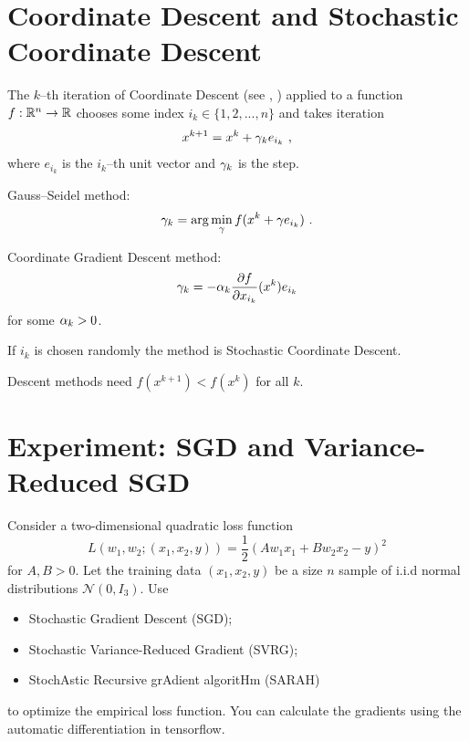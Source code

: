 \section{Coordinate Descent and Stochastic Coordinate Descent}

The $k$--th iteration of Coordinate Descent (see \cite{CoordinateDescentWrightPaper}, \cite{CoordinateDescentNesterovPaper}) applied to a function $f: \mathbb R^n\rightarrow \mathbb R$ chooses some index $i_k\in \{1,2,...,n\}$
and takes iteration
$$x^{k+1}=x^k+\gamma_k e_{i_k} \ ,$$
where $e_{i_k}$ is the $i_k$--th unit vector and $\gamma_k$ is the step. 

\begin{example}
Gauss--Seidel method: 
$$\gm_k=\arg\min\li_{\gm}f(x^k+\gm e_{i_k})  \ .$$
\end{example}

\begin{example} Coordinate Gradient Descent method:
$$\gamma_k=-\alpha_k \dfrac{\partial f}{\partial x_{i_k}}(x^k)e_{i_k}$$
for some $\alpha_k>0$. 
\end{example}

\begin{example}
If $i_k$ is chosen randomly the method is Stochastic Coordinate Descent.
\end{example}

Descent methods need $f(x^{k+1})<f(x^k)$ for all $k$.

\section{Experiment: SGD and Variance-Reduced SGD} 

Consider a two-dimensional quadratic loss function $$L(w_1, w_2; (x_1, x_2, y)) = \dfrac{1}{2}(Aw_1x_1+Bw_2x_2-y)^2$$ for $A, B>0$. Let the training data $(x_1, x_2, y)$ be a size $n$ sample of i.i.d normal distributions $\mathcal{N}(0, I_3)$. Use
\begin{itemize} 
\item[(a)] Stochastic Gradient Descent (SGD); 

\item[(b)] Stochastic Variance-Reduced Gradient (SVRG); 

\item[(c)] StochAstic Recursive grAdient algoritHm (SARAH) 
\end{itemize}
to optimize the empirical loss function. You can calculate the gradients using the automatic differentiation in tensorflow.

